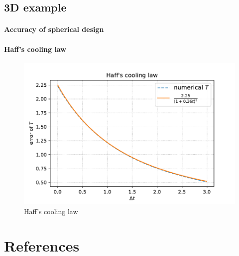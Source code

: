 \documentclass[review, times]{elsarticle}
\begin{document}
\subsection{3D example}

\paragraph{\bf Accuracy of spherical design}

\paragraph{\bf Haff's cooling law}
\begin{figure}[htb]
  \centering
  \includegraphics[width = .8\linewidth]{figs/Haff's_cooling}
  \caption{Haff's cooling law}
  \label{Haff_cooling}
\end{figure}


\section*{References}

% 
\end{document}
